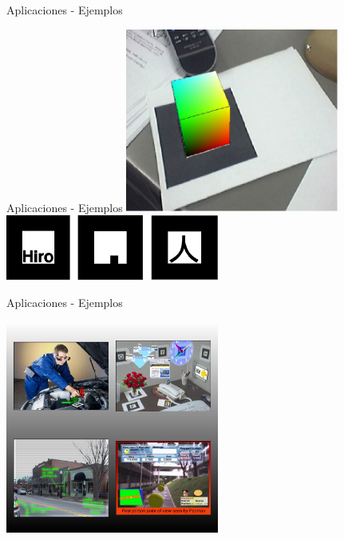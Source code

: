 \begin{frame}{Aplicaciones - Ejemplos}
	\begin{center}{Aplicaciones - Ejemplos}
	  \includegraphics[width=7cm]{./img1/objeto_y_patron}
  	  \includegraphics[width=7cm]{./img1/patrones}
	\end{center}
\end{frame}

\begin{frame}{Aplicaciones - Ejemplos}
	\begin{center}
	  \includegraphics[width=7cm]{./img1/aplic1}
	\end{center}
\end{frame}

